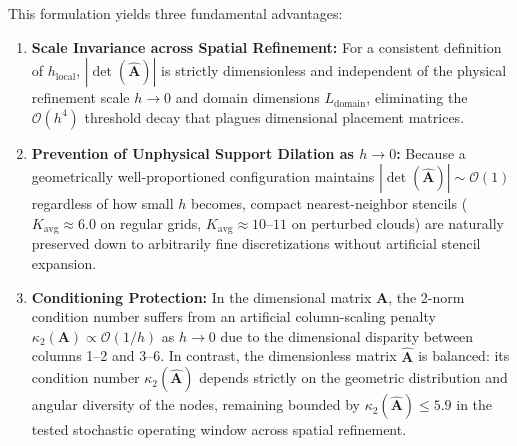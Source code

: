 \documentclass[preprint,12pt]{elsarticle}
\begin{document}
This formulation yields three fundamental advantages:
\begin{enumerate}
    \item \textbf{Scale Invariance across Spatial Refinement:} For a consistent definition of $h_{\mathrm{local}}$, $|\det(\widehat{\mathbf{A}})|$ is strictly dimensionless and independent of the physical refinement scale $h \to 0$ and domain dimensions $L_{\mathrm{domain}}$, eliminating the $\mathcal{O}(h^4)$ threshold decay that plagues dimensional placement matrices.
    \item \textbf{Prevention of Unphysical Support Dilation as $h \to 0$:} Because a geometrically well-proportioned configuration maintains $|\det(\widehat{\mathbf{A}})| \sim \mathcal{O}(1)$ regardless of how small $h$ becomes, compact nearest-neighbor stencils ($K_{\mathrm{avg}} \approx 6.0$ on regular grids, $K_{\mathrm{avg}} \approx 10\text{--}11$ on perturbed clouds) are naturally preserved down to arbitrarily fine discretizations without artificial stencil expansion.
    \item \textbf{Conditioning Protection:} In the dimensional matrix $\mathbf{A}$, the 2-norm condition number suffers from an artificial column-scaling penalty $\kappa_2(\mathbf{A}) \propto \mathcal{O}(1/h)$ as $h \to 0$ due to the dimensional disparity between columns 1--2 and 3--6. In contrast, the dimensionless matrix $\widehat{\mathbf{A}}$ is balanced: its condition number $\kappa_2(\widehat{\mathbf{A}})$ depends strictly on the geometric distribution and angular diversity of the nodes, remaining bounded by $\kappa_2(\widehat{\mathbf{A}}) \le 5.9$ in the tested stochastic operating window across spatial refinement.
\end{enumerate}
\end{document}
